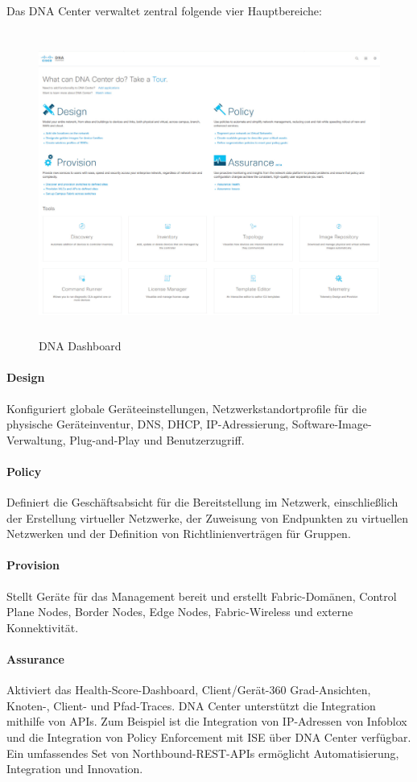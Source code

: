 Das DNA Center verwaltet zentral folgende vier Hauptbereiche: \cite{sda-designguide}

\begin{figure}[H]
	\centering
	\includegraphics[height=10cm]{img/DNA-Dashboard.png}
	\caption{DNA Dashboard}
	\label{fig:DNA Dashboard}
\end{figure}


\paragraph{Design}
Konfiguriert globale Geräteeinstellungen, Netzwerkstandortprofile für die physische Geräteinventur, DNS, DHCP, IP-Adressierung, Software-Image-Verwaltung, Plug-and-Play und Benutzerzugriff.
\paragraph{Policy}
Definiert die Geschäftsabsicht für die Bereitstellung im Netzwerk, einschließlich der Erstellung virtueller Netzwerke, der Zuweisung von Endpunkten zu virtuellen Netzwerken und der Definition von Richtlinienverträgen für Gruppen.
\paragraph{Provision}
Stellt Geräte für das Management bereit und erstellt Fabric-Domänen, Control Plane Nodes, Border Nodes, Edge Nodes, Fabric-Wireless und externe Konnektivität.

\paragraph{Assurance}
Aktiviert das Health-Score-Dashboard, Client/Gerät-360 Grad-Ansichten, Knoten-, Client- und Pfad-Traces. DNA Center unterstützt die Integration mithilfe von APIs. Zum Beispiel ist die Integration von IP-Adressen von Infoblox und die Integration von Policy Enforcement mit ISE über DNA Center verfügbar. Ein umfassendes Set von Northbound-REST-APIs ermöglicht Automatisierung, Integration und Innovation.



